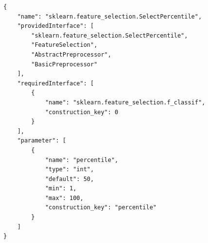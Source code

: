 \begin{verbatim}
{
    "name": "sklearn.feature_selection.SelectPercentile",
    "providedInterface": [
        "sklearn.feature_selection.SelectPercentile",
        "FeatureSelection",
        "AbstractPreprocessor",
        "BasicPreprocessor"
    ],
    "requiredInterface": [
        {
            "name": "sklearn.feature_selection.f_classif",
            "construction_key": 0
        }
    ],
    "parameter": [
        {
            "name": "percentile",
            "type": "int",
            "default": 50,
            "min": 1,
            "max": 100,
            "construction_key": "percentile"
        }
    ]
}
\end{verbatim}
